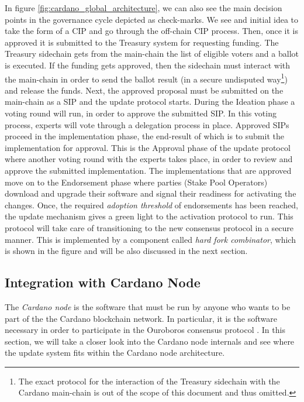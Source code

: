 In figure \ref{fig:cardano_global_architecture}, we can also see the main 
decision points in the governance cycle depicted as check-marks. We see and 
initial idea to take the form of a CIP and go through the off-chain CIP 
process. Then, once it is approved it is submitted to the Treasury system for 
requesting funding. The Treasury sidechain gets from the main-chain the list of 
eligible voters and a ballot is executed. If the funding gets approved, then 
the sidechain must interact with the main-chain in order to send the ballot 
result (in a secure undisputed way\footnote{The exact protocol for the 
	interaction of the Treasury sidechain with the Cardano main-chain is out of 
	the 
	scope of this document and thus omitted.}) and release the funds. Next, the 
approved 
proposal must be submitted on 
the main-chain as a SIP and the update protocol starts. During the Ideation 
phase a voting round will run, in order to approve the submitted SIP. In this 
voting process, experts will vote through a delegation process in place. 
Approved SIPs proceed in the implementation phase, the end-result of which is 
to submit the implementation for approval. This is the Approval phase of the 
update protocol where another voting round with the experts takes place, in 
order to review and approve the submitted implementation. The implementations 
that are approved move on to the Endorsement phase where parties (Stake Pool 
Operators) download and upgrade their software and signal their readiness for 
activating the changes. Once, the required \emph{adoption threshold} of 
endorsements has been reached, the update mechanism gives a green light to the 
activation protocol to run. This protocol will take care of transitioning to 
the new consensus protocol in a secure manner. This is 
implemented by a component called \emph{hard fork combinator}, which is shown 
in the figure and will be also discussed in the next section.

\subsection{Integration with Cardano Node} \label{integration_with_cardano}
The \emph{Cardano node} is the software that must be run by anyone who wants to 
be part of the the Cardano blockchain network. In particular, it is the 
software necessary in order to participate in the 
Ouroboros consensus protocol \cite{C:KRDO17}. In this section, we will take a 
closer look into the Cardano node internals and see where the update 
system fits within the Cardano node architecture. 

